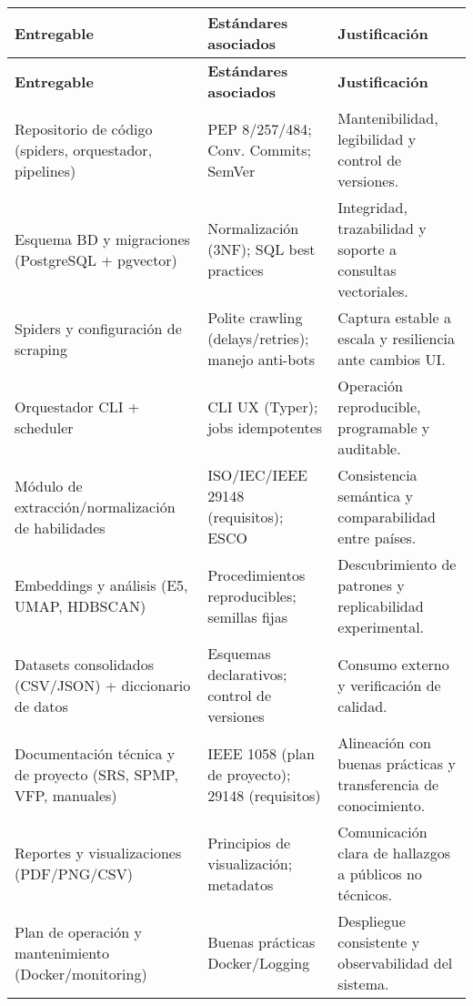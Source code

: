 \begin{longtable}{|p{5cm}|p{5cm}|p{5cm}|}
\hline
\textbf{Entregable} & \textbf{Estándares asociados} & \textbf{Justificación} \\
\hline
\endfirsthead

\hline
\textbf{Entregable} & \textbf{Estándares asociados} & \textbf{Justificación} \\
\hline
\endhead

\hline
\endfoot

\hline
\endlastfoot

Repositorio de código (spiders, orquestador, pipelines) & PEP 8/257/484; Conv. Commits; SemVer & Mantenibilidad, legibilidad y control de versiones. \\
\hline

Esquema BD y migraciones (PostgreSQL + pgvector) & Normalización (3NF); SQL best practices & Integridad, trazabilidad y soporte a consultas vectoriales. \\
\hline

Spiders y configuración de scraping & Polite crawling (delays/retries); manejo anti-bots & Captura estable a escala y resiliencia ante cambios UI. \\
\hline

Orquestador CLI + scheduler & CLI UX (Typer); jobs idempotentes & Operación reproducible, programable y auditable. \\
\hline

Módulo de extracción/normalización de habilidades & ISO/IEC/IEEE 29148 (requisitos); ESCO & Consistencia semántica y comparabilidad entre países. \\
\hline

Embeddings y análisis (E5, UMAP, HDBSCAN) & Procedimientos reproducibles; semillas fijas & Descubrimiento de patrones y replicabilidad experimental. \\
\hline

Datasets consolidados (CSV/JSON) + diccionario de datos & Esquemas declarativos; control de versiones & Consumo externo y verificación de calidad. \\
\hline

Documentación técnica y de proyecto (SRS, SPMP, VFP, manuales) & IEEE 1058 (plan de proyecto); 29148 (requisitos) & Alineación con buenas prácticas y transferencia de conocimiento. \\
\hline

Reportes y visualizaciones (PDF/PNG/CSV) & Principios de visualización; metadatos & Comunicación clara de hallazgos a públicos no técnicos. \\
\hline

Plan de operación y mantenimiento (Docker/monitoring) & Buenas prácticas Docker/Logging & Despliegue consistente y observabilidad del sistema. \\
\hline

\end{longtable}
